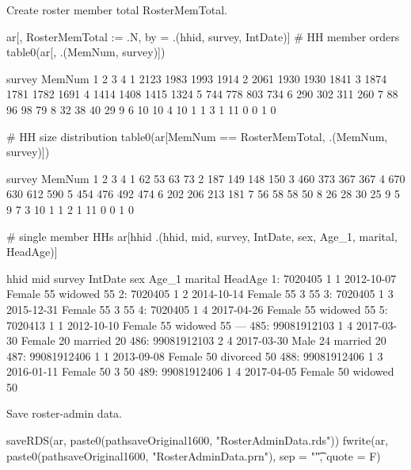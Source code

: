 Create roster member total \textsf{RosterMemTotal}. 
\begin{Schunk}
\begin{Sinput}
ar[, RosterMemTotal := .N, by = .(hhid, survey, IntDate)]
# HH member orders
table0(ar[, .(MemNum, survey)])
\end{Sinput}
\begin{Soutput}
      survey
MemNum    1    2    3    4
    1  2123 1983 1993 1914
    2  2061 1930 1930 1841
    3  1874 1781 1782 1691
    4  1414 1408 1415 1324
    5   744  778  803  734
    6   290  302  311  260
    7    88   96   98   79
    8    32   38   40   29
    9     6   10   10    4
    10    1    1    3    1
    11    0    0    1    0
\end{Soutput}
\begin{Sinput}
# HH size distribution
table0(ar[MemNum == RosterMemTotal, .(MemNum, survey)])
\end{Sinput}
\begin{Soutput}
      survey
MemNum   1   2   3   4
    1   62  53  63  73
    2  187 149 148 150
    3  460 373 367 367
    4  670 630 612 590
    5  454 476 492 474
    6  202 206 213 181
    7   56  58  58  50
    8   26  28  30  25
    9    5   9   7   3
    10   1   1   2   1
    11   0   0   1   0
\end{Soutput}
\begin{Sinput}
# single member HHs
ar[hhid %in% hhid[RosterMemTotal == 1], 
  .(hhid, mid, survey, IntDate, sex, Age_1, marital, HeadAge)]
\end{Sinput}
\begin{Soutput}
            hhid mid survey    IntDate    sex Age_1  marital HeadAge
  1:     7020405   1      1 2012-10-07 Female    55  widowed      55
  2:     7020405   1      2 2014-10-14 Female    55        3      55
  3:     7020405   1      3 2015-12-31 Female    55        3      55
  4:     7020405   1      4 2017-04-26 Female    55  widowed      55
  5:     7020413   1      1 2012-10-10 Female    55  widowed      55
 ---                                                                
485: 99081912103   1      4 2017-03-30 Female    20  married      20
486: 99081912103   2      4 2017-03-30   Male    24  married      20
487: 99081912406   1      1 2013-09-08 Female    50 divorced      50
488: 99081912406   1      3 2016-01-11 Female    50        3      50
489: 99081912406   1      4 2017-04-05 Female    50  widowed      50
\end{Soutput}
\end{Schunk}
Save roster-admin data.
\begin{Schunk}
\begin{Sinput}
saveRDS(ar, paste0(pathsaveOriginal1600, "RosterAdminData.rds"))
fwrite(ar, paste0(pathsaveOriginal1600, "RosterAdminData.prn"), sep = "\t", quote = F)
\end{Sinput}
\end{Schunk}


